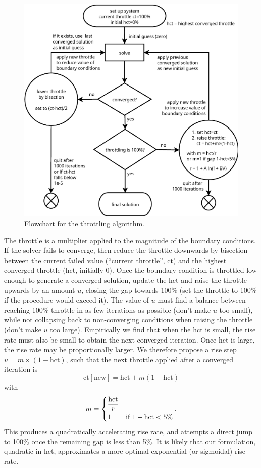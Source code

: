 \begin{figure}
\centering
\includegraphics[width=1.1\linewidth]{throttling4.eps}
\caption{Flowchart for the throttling algorithm. }
\label{fig:throttling_algorithm}
\end{figure}

The throttle is a multiplier
applied to the magnitude of the boundary conditions.
If the solver fails to converge, then reduce the throttle downwards by
bisection between the current failed value (``current throttle'', ct) and the highest converged
throttle (hct, initially 0). Once the boundary
condition is throttled low enough to generate a converged solution,
update the hct and raise
the throttle upwards by an amount $u$, closing the gap towards 100\% (set the throttle
to 100\% if the procedure would exceed it).  The value of $u$
must find a balance between reaching 100\% throttle in as few
iterations as possible (don't make $u$ too small), while not collapsing back to non-converging
conditions when raising the throttle (don't make $u$ too
large). Empirically we find that when the hct is small, the rise rate
must also be small to obtain the next converged iteration. Once hct is
large, the rise rate may be proportionally larger. We therefore
propose a rise step $u=m\times (1- \mathrm{hct})$, such that the next
throttle applied after a converged iteration is
\begin{equation}
  \mathrm{ct [new]} = \mathrm{hct} + m (1-\mathrm{hct})
\end{equation}
with
\begin{equation}
  m=
  \begin{dcases}
    \frac{\mathrm{hct}}{r} & \\
    1 & \text{if } 1-\mathrm{hct} < 5\%
  \end{dcases}.
\end{equation}
This produces a quadratically accelerating rise rate,  and attempts a
direct jump to 100\% once the remaining gap is less than 5\%.  It is likely
that our formulation, quadratic in hct, approximates a more 
optimal exponential (or
sigmoidal) rise rate.

